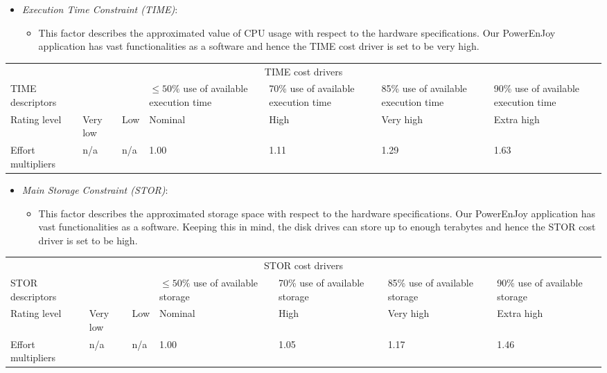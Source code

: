 \begin{itemize}
	\item \emph{Execution Time Constraint (TIME)}:
	\begin{itemize}
		\item[] This factor describes the approximated value of CPU usage with respect to the hardware specifications. Our PowerEnJoy application has vast functionalities as a software and hence the TIME cost driver is set to be very high.
	\end{itemize}
\end{itemize}

\begin{table}[H]
	\hspace*{-1.7cm}
	\begin{tabular}{|p{2cm}|p{2cm}|p{2cm}|p{2cm}|p{2cm}|p{2cm}|p{2cm}|}
		\hline
		\multicolumn{7}{|c|}{TIME cost drivers} \\
		\hhline{|=======|}
		TIME descriptors & & & \(\leq 50\%\) use of available execution time & 70\% use of available execution time & 85\% use of available execution time & 90\% use of available execution time \\
		\hline
		Rating level & Very low & Low & Nominal & High & Very high & Extra high \\
		\hline
		Effort multipliers & n/a & n/a & 1.00 & 1.11 & 1.29 & 1.63 \\
		\hline
	\end{tabular}
\end{table}

\begin{itemize}
	\item \emph{Main Storage Constraint (STOR)}:
	\begin{itemize}
		\item[] This factor describes the approximated storage space with respect to the hardware specifications. Our PowerEnJoy application
has vast functionalities as a software. Keeping this in mind, the disk drives can store up to enough terabytes and hence the STOR cost driver is set to be high.
	\end{itemize}
\end{itemize}

\begin{table}[H]
	\hspace*{-1.7cm}
	\begin{tabular}{|p{2cm}|p{2cm}|p{2cm}|p{2cm}|p{2cm}|p{2cm}|p{2cm}|}
		\hline
		\multicolumn{7}{|c|}{STOR cost drivers} \\
		\hhline{|=======|}
		STOR descriptors & & & \(\leq 50\%\) use of available storage & 70\% use of available storage & 85\% use of available storage & 90\% use of available storage \\
		\hline
		Rating level & Very low & Low & Nominal & High & Very high & Extra high \\
		\hline
		Effort multipliers & n/a & n/a & 1.00 & 1.05 & 1.17 & 1.46 \\
		\hline
	\end{tabular}
\end{table}

